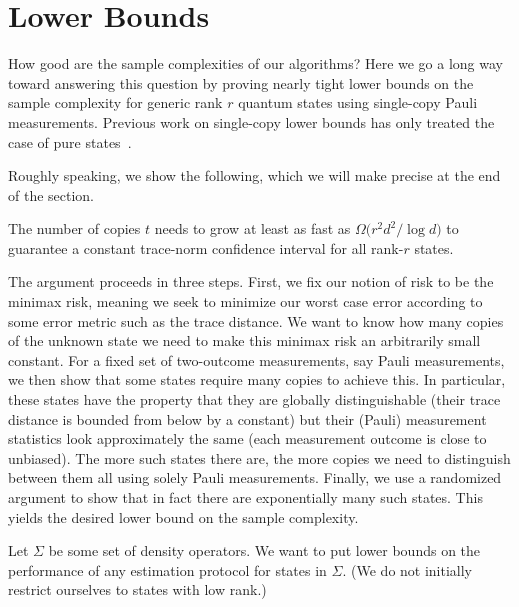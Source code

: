 

\section{Lower Bounds}\label{S:lowerbound}


How good are the sample complexities of our algorithms? Here we go a long way toward answering this question by proving nearly tight lower bounds on the sample complexity for generic rank $r$ quantum states using single-copy Pauli measurements. Previous work on single-copy lower bounds has only treated the case of pure states~\cite{Flammia2011}. 

Roughly speaking, we show the following, which we will make precise at the end of the section.
\begin{theorem}\label{Thm:lower}
	The number of copies $t$ needs to grow at least as fast as $\Omega\bigl(r^2d^2/\log
	d\bigr)$ to guarantee a constant trace-norm confidence interval for all
	rank-$r$ states.
\end{theorem}

The argument proceeds in three steps. First, we fix our notion of risk to be the minimax risk, meaning we seek to minimize our worst case error according to some error metric such as the trace distance. We want to know how many copies of the unknown state we need to make this minimax risk an arbitrarily small constant. For a fixed set of two-outcome measurements, say Pauli measurements, we then show that some states require many copies to achieve this. In particular, these states have the property that they are globally distinguishable (their trace distance is bounded from below by a constant) but their (Pauli) measurement statistics look approximately the same (each measurement outcome is close to unbiased). The more such states there are, the more copies we need to distinguish between them all using solely Pauli measurements. Finally, we use a randomized argument to show that in fact there are exponentially many such states. This yields the desired lower bound on the sample complexity.

Let $\Sigma$ be some set of density operators. We want to put lower bounds on the performance of any estimation protocol for states in $\Sigma$. (We do not initially restrict ourselves to states with low rank.)

